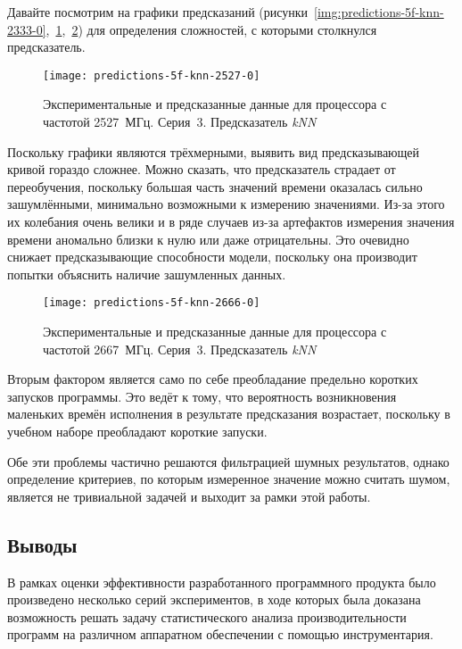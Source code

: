 Давайте посмотрим на графики предсказаний (рисунки~\ref{img:predictions-5f-knn-2333-0},~\ref{img:predictions-5f-knn-2527-0},~\ref{img:predictions-5f-knn-2666-0}) для определения сложностей, с которыми столкнулся предсказатель.

\begin{figure}[H]
    \begin{center}
        \texttt{[image: predictions-5f-knn-2527-0]}
        \caption{Экспериментальные и предсказанные данные для процессора с частотой 2527~МГц. Серия~3. Предсказатель \textit{kNN}}
        \label{img:predictions-5f-knn-2527-0}
    \end{center}
\end{figure}

Поскольку графики являются трёхмерными, выявить вид предсказывающей кривой гораздо сложнее. Можно сказать, что предсказатель страдает от переобучения, поскольку большая часть значений времени оказалась сильно зашумлёнными, минимально возможными к измерению значениями. Из-за этого их колебания очень велики и в ряде случаев из-за артефактов измерения значения времени аномально близки к нулю или даже отрицательны. Это очевидно снижает предсказывающие способности модели, поскольку она производит попытки объяснить наличие зашумленных данных.

\begin{figure}[H]
    \begin{center}
        \texttt{[image: predictions-5f-knn-2666-0]}
        \caption{Экспериментальные и предсказанные данные для процессора с частотой 2667~МГц. Серия~3. Предсказатель \textit{kNN}}
        \label{img:predictions-5f-knn-2666-0}
    \end{center}
\end{figure}

Вторым фактором является само по себе преобладание предельно коротких запусков программы. Это ведёт к тому, что вероятность возникновения маленьких времён исполнения в результате предсказания возрастает, поскольку в учебном наборе преобладают короткие запуски.

Обе эти проблемы частично решаются фильтрацией шумных результатов, однако определение критериев, по которым измеренное значение можно считать шумом, является не тривиальной задачей и выходит за рамки этой работы.


\subsection{Выводы}
В рамках оценки эффективности разработанного программного продукта было произведено несколько серий экспериментов, в ходе которых была доказана возможность решать задачу статистического анализа производительности программ на различном аппаратном обеспечении с помощью инструментария.